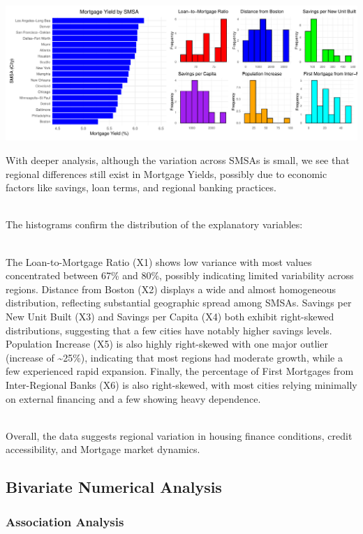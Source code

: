 \documentclass[
  11pt,
]{article}
\begin{document}
\includegraphics{Figs/unnamed-chunk-4-1.pdf}

With deeper analysis, although the variation across SMSAs is small, we
see that regional differences still exist in Mortgage Yields, possibly
due to economic factors like savings, loan terms, and regional banking
practices.\\
\strut \\
The histograms confirm the distribution of the explanatory variables:\\
\strut \\
The Loan-to-Mortgage Ratio (X1) shows low variance with most values
concentrated between 67\% and 80\%, possibly indicating limited
variability across regions. Distance from Boston (X2) displays a wide
and almost homogeneous distribution, reflecting substantial geographic
spread among SMSAs. Savings per New Unit Built (X3) and Savings per
Capita (X4) both exhibit right-skewed distributions, suggesting that a
few cities have notably higher savings levels. Population Increase (X5)
is also highly right-skewed with one major outlier (increase of
\textasciitilde25\%), indicating that most regions had moderate growth,
while a few experienced rapid expansion. Finally, the percentage of
First Mortgages from Inter-Regional Banks (X6) is also right-skewed,
with most cities relying minimally on external financing and a few
showing heavy dependence.\\
\strut \\
Overall, the data suggests regional variation in housing finance
conditions, credit accessibility, and Mortgage market dynamics.

\subsection{Bivariate Numerical
Analysis}\label{bivariate-numerical-analysis}

\subsubsection{Association Analysis}\label{association-analysis}
\end{document}
